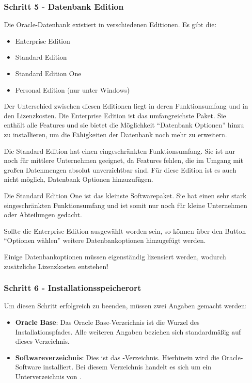         \subsubsection{Schritt 5 - Datenbank Edition}
          Die Oracle-Datenbank existiert in verschiedenen Editionen. Es gibt die:
          \begin{itemize}
            \item Enterprise Edition
            \item Standard Edition
            \item Standard Edition One
            \item Personal Edition (nur unter Windows)
          \end{itemize}
          Der Unterschied zwischen diesen Editionen liegt in deren Funktionsumfang und in den Lizenzkosten. Die Enterprise Edition ist das umfangreichste Paket. Sie enthält alle Features und sie bietet die Möglichkeit \enquote{Datenbank Optionen} hinzu zu installieren, um die Fähigkeiten der Datenbank noch mehr zu erweitern.

          Die Standard Edition hat einen eingeschränkten Funktionsumfang. Sie ist nur noch für  mittlere Unternehmen geeignet, da Features fehlen, die im Umgang mit großen Datenmengen absolut unverzichtbar sind. Für diese Edition ist es auch nicht möglich, Datenbank Optionen hinzuzufügen.

          Die Standard Edition One ist das kleinste Softwarepaket. Sie hat einen sehr stark eingeschränkten Funktionsumfang und ist somit nur noch für kleine Unternehmen oder Abteilungen gedacht.

          Sollte die Enterprise Edition ausgewählt worden sein, so können über den Button \enquote{Optionen wählen} weitere Datenbankoptionen hinzugefügt werden.

          \begin{merke}
            Einige Datenbankoptionen müssen eigenständig lizensiert werden, wodurch zusätzliche Lizenzkosten entstehen!
          \end{merke}
        \subsubsection{Schritt 6 - Installationsspeicherort}
          Um diesen Schritt erfolgreich zu beenden, müssen zwei Angaben gemacht werden:
          \begin{itemize}
            \item \textbf{Oracle Base}: Das Oracle Base-Verzeichnis ist die Wurzel des Installationspfades. Alle weiteren Angaben beziehen sich standardmäßig auf dieses Verzeichnis.
            \item \textbf{Softwareverzeichnis}: Dies ist das -Verzeichnis. Hierhinein wird die Oracle-Software installiert. Bei diesem Verzeichnis handelt es sich um ein Unterverzeichnis von .
          \end{itemize}
